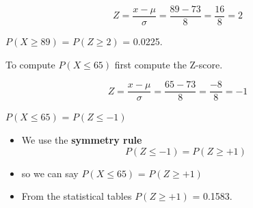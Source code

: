 \documentclass[a4paper,12pt]{article}
\begin{document}
	\[ Z = \frac{x - \mu}{\sigma} = \frac{89 - 73}{8} =\frac{16}{8} = 2 \]
	
	$P(X \geq 89)$ = $P(Z \geq 2)$ = 0.0225.
	
	To compute $P(X \leq 65)$ first compute the Z-score.
	
	\[ Z = \frac{x - \mu}{\sigma} = \frac{65 - 73}{8} =\frac{-8}{8} = -1 \]
	
	$P(X \leq 65)$ = $P(Z \leq -1)$ 
	
	\begin{itemize}
		\item We use the \textbf{symmetry rule}
		\[ P(Z \leq -1) = P(Z \geq +1) \]
		\item so we can say $P(X \leq 65)$ = $P(Z \geq +1)$ 
		\item From the statistical tables $P(Z \geq +1)$ = 0.1583.
	\end{itemize}


	

	
\end{document}
